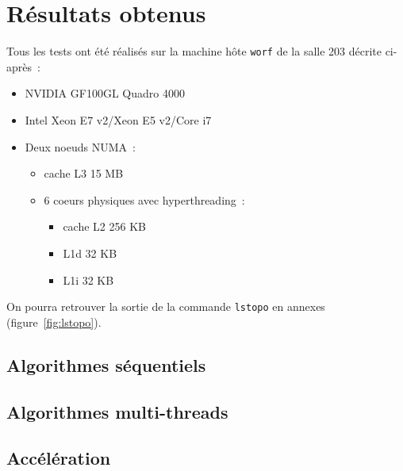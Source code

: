 \section {Résultats obtenus}

Tous les tests ont été réalisés sur la machine hôte \texttt{worf} de
la salle 203 décrite ci-après~:
\begin{itemize}
\item NVIDIA GF100GL Quadro 4000
\item Intel Xeon E7 v2/Xeon E5 v2/Core i7
\item Deux noeuds NUMA~:
  \begin{itemize}
  \item cache L3 15 MB
  \item 6 coeurs physiques avec hyperthreading~:
    \begin{itemize}
    \item cache L2 256 KB
    \item L1d 32 KB
    \item L1i 32 KB
    \end{itemize}
  \end{itemize}
\end{itemize}
On pourra retrouver la sortie de la commande \texttt{lstopo} en
annexes (figure~\ref{fig:lstopo}).

\subsection{Algorithmes séquentiels}



\subsection{Algorithmes multi-threads}

\subsection{Accélération}
